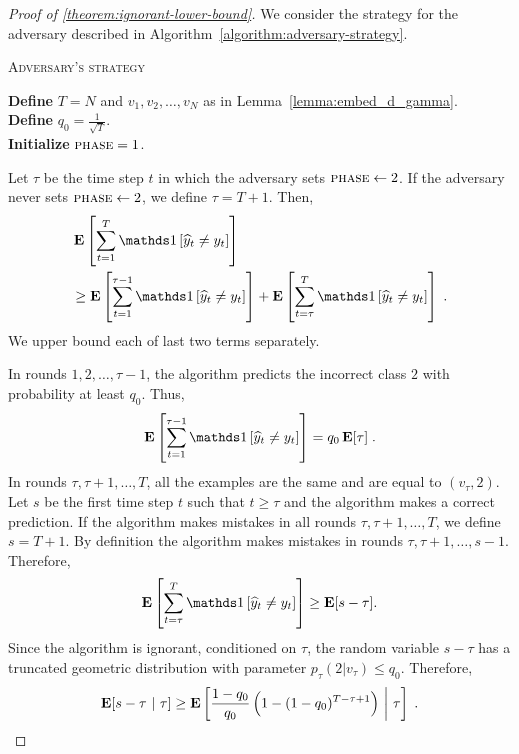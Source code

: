 \begin{proof}[Proof of \autoref{theorem:ignorant-lower-bound}]
We consider the strategy for the adversary described in
Algorithm~\ref{algorithm:adversary-strategy}.

\begin{algorithm}
\caption{\textsc{Adversary's strategy}}
\label{algorithm:adversary-strategy}
\textbf{Define} $T=N$ and $v_1, v_2, \dots, v_N$ as in Lemma~\ref{lemma:embed_d_gamma}.\\
\textbf{Define} $q_0=\frac{1}{\sqrt{T}}$. \\
\textbf{Initialize} $\textsc{phase}= 1$. \\
\end{algorithm}

Let $\tau$ be the time step $t$ in which the adversary sets $\textsc{phase}\leftarrow 2$.
If the adversary never sets $\textsc{phase}\leftarrow 2$, we define $\tau = T + 1$.
Then,
\begin{align}
& \Exp \left[\sum_{t=1}^T \indicator{\widehat y_t\neq y_t}\right] \nonumber \\
& \ge \Exp\left[\sum_{t=1}^{\tau - 1} \indicator{\widehat y_t\neq y_t}\right]
+ \Exp\left[\sum_{t=\tau}^T \indicator{\widehat y_t\neq y_t}\right] \; .
\end{align}
We upper bound each of last two terms separately.

In rounds $1,2,\dots,\tau-1$, the algorithm predicts the incorrect class $2$
with probability at least $q_0$. Thus,
$$
\Exp\left[\sum_{t=1}^{\tau - 1} \indicator{\widehat y_t\neq y_t}\right] = q_0 \Exp[\tau] \; .
$$
In rounds $\tau, \tau+1, \dots, T$, all the examples are the same and are equal
to $(v_\tau, 2)$. Let $s$ be the first time step $t$ such that $t \ge \tau$
and the algorithm makes a correct prediction. If the algorithm makes mistakes
in all rounds $\tau, \tau+1, \dots, T$, we define $s = T+1$.
By definition the algorithm makes mistakes in rounds $\tau, \tau+1, \dots, s-1$.
Therefore,
$$
\Exp\left[\sum_{t=\tau}^T \indicator{\widehat y_t\neq y_t}\right] \ge \Exp[s-\tau].
$$
Since the algorithm is ignorant, conditioned on $\tau$, the random variable $s-\tau$
has a truncated geometric distribution with parameter $p_\tau(2|v_\tau) \le q_0$.
Therefore,
$$
\operatorname*{\mathbf{E}}[s-\tau ~|~ \tau]
\ge
\operatorname*{\mathbf{E}} \left[\frac{1-q_0}{q_0}\left(1-(1-q_0)^{T-\tau+1}\right) ~\middle|~ \tau \right] \; .
$$


\end{proof}
